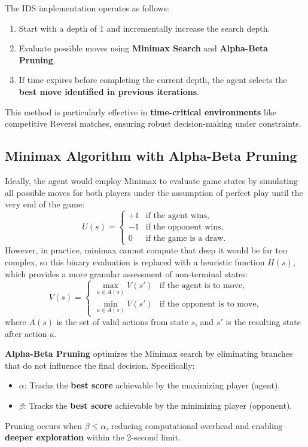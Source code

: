\documentclass[11pt]{article}
\begin{document}
\noindent The IDS implementation operates as follows:
\begin{enumerate}
    \item Start with a depth of 1 and incrementally increase the search depth.
    \item Evaluate possible moves using \textbf{Minimax Search} and \textbf{Alpha-Beta Pruning}.
    \item If time expires before completing the current depth, the agent selects the \textbf{best move identified in previous iterations}.
\end{enumerate}

This method is particularly effective in \textbf{time-critical environments} like competitive Reversi matches, ensuring robust decision-making under constraints.

\subsection*{Minimax Algorithm with Alpha-Beta Pruning}
\noindent Ideally, the agent would employ Minimax to evaluate game states by simulating all possible moves for both players under the assumption of perfect play until the very end of the game:
\[
U(s) = 
\begin{cases} 
+1 & \text{if the agent wins}, \\
-1 & \text{if the opponent wins}, \\
0 & \text{if the game is a draw}.
\end{cases}
\]
However, in practice, minimax cannot compute that deep it would be far too complex, so this binary evaluation is replaced with a heuristic function \(H(s)\), which provides a more granular assessment of non-terminal states:
\[
V(s) = 
\begin{cases} 
\max_{a \in A(s)} V(s') & \text{if the agent is to move}, \\
\min_{a \in A(s)} V(s') & \text{if the opponent is to move},
\end{cases}
\]
where \(A(s)\) is the set of valid actions from state \(s\), and \(s'\) is the resulting state after action \(a\).

\noindent \textbf{Alpha-Beta Pruning} optimizes the Minimax search by eliminating branches that do not influence the final decision. Specifically:
\begin{itemize}
    \item \(\alpha\): Tracks the \textbf{best score} achievable by the maximizing player (agent).
    \item \(\beta\): Tracks the \textbf{best score} achievable by the minimizing player (opponent).
\end{itemize}
Pruning occurs when \(\beta \leq \alpha\), reducing computational overhead and enabling \textbf{deeper exploration} within the 2-second limit.
\end{document}
